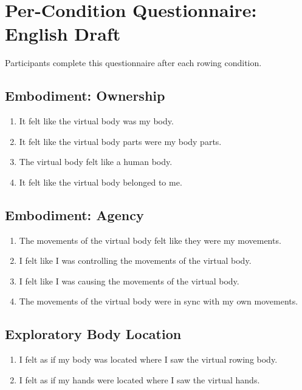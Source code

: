\section{Per-Condition Questionnaire: English Draft}
\label{app:questionnaires_per_condition_english}

Participants complete this questionnaire after each rowing condition.

\subsection*{Embodiment: Ownership}


\begin{enumerate}
    \item It felt like the virtual body was my body.
    \item It felt like the virtual body parts were my body parts.
    \item The virtual body felt like a human body.
    \item It felt like the virtual body belonged to me.
\end{enumerate}

\subsection*{Embodiment: Agency}

\begin{enumerate}
    \item The movements of the virtual body felt like they were my movements.
    \item I felt like I was controlling the movements of the virtual body.
    \item I felt like I was causing the movements of the virtual body.
    \item The movements of the virtual body were in sync with my own movements.
\end{enumerate}

\subsection*{Exploratory Body Location}

\begin{enumerate}
    \item I felt as if my body was located where I saw the virtual rowing body.
    \item I felt as if my hands were located where I saw the virtual hands.
\end{enumerate}

